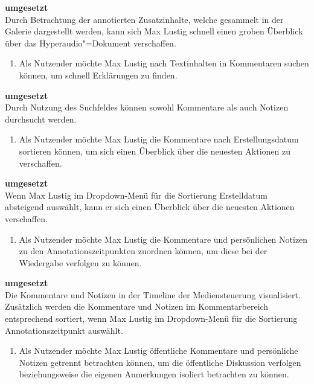\vspace{-0.1cm}
\textbf{umgesetzt}\\
Durch Betrachtung der annotierten Zusatzinhalte, welche gesammelt in der Galerie dargestellt werden, kann sich Max Lustig schnell einen groben Überblick über das Hyperaudio"=Dokument verschaffen.
\vspace{0.25cm}
\begin{enumerate}[resume*]
\item \label{US-Suche-Eval} Als Nutzender möchte Max Lustig nach Textinhalten in Kommentaren suchen können, um schnell Erklärungen zu finden.
\end{enumerate}
\vspace{-0.1cm}
\textbf{umgesetzt}\\
Durch Nutzung des Suchfeldes können sowohl Kommentare als auch Notizen durchsucht werden.
\vspace{0.25cm}
\begin{enumerate}[resume*]
\item \label{US-Sortierung-Erstellungsdatum-Eval} Als Nutzender möchte Max Lustig die Kommentare nach Erstellungsdatum sortieren können, um sich einen Überblick über die neuesten Aktionen zu verschaffen.
\end{enumerate}
\vspace{-0.1cm}
\textbf{umgesetzt}\\
Wenn Max Lustig im Dropdown-Menü für die Sortierung \glqq Erstelldatum absteigend\grqq{} auswählt, kann er sich einen Überblick über die neuesten Aktionen verschaffen.
\vspace{0.25cm}
\begin{enumerate}[resume*]
\item \label{US-Sortierung-Zeitpunkt-Eval} Als Nutzender möchte Max Lustig die Kommentare und persönlichen Notizen zu den Annotationszeitpunkten zuordnen können, um diese bei der Wiedergabe verfolgen zu können.
\end{enumerate}
\vspace{-0.1cm}
\textbf{umgesetzt}\\
Die Kommentare und Notizen in der Timeline der Mediensteuerung visualisiert. Zusätzlich werden die Kommentare und Notizen im Kommentarbereich entsprechend sortiert, wenn Max Lustig im Dropdown-Menü für die Sortierung \glqq Annotationszeitpunkt\grqq{} auswählt.
\vspace{0.25cm}
\begin{enumerate}[resume*]
\item \label{US-Filter-Eval} Als Nutzender möchte Max Lustig öffentliche Kommentare und persönliche Notizen getrennt betrachten können, um die öffentliche Diskussion verfolgen beziehungsweise die eigenen Anmerkungen isoliert betrachten zu können.
\end{enumerate}
